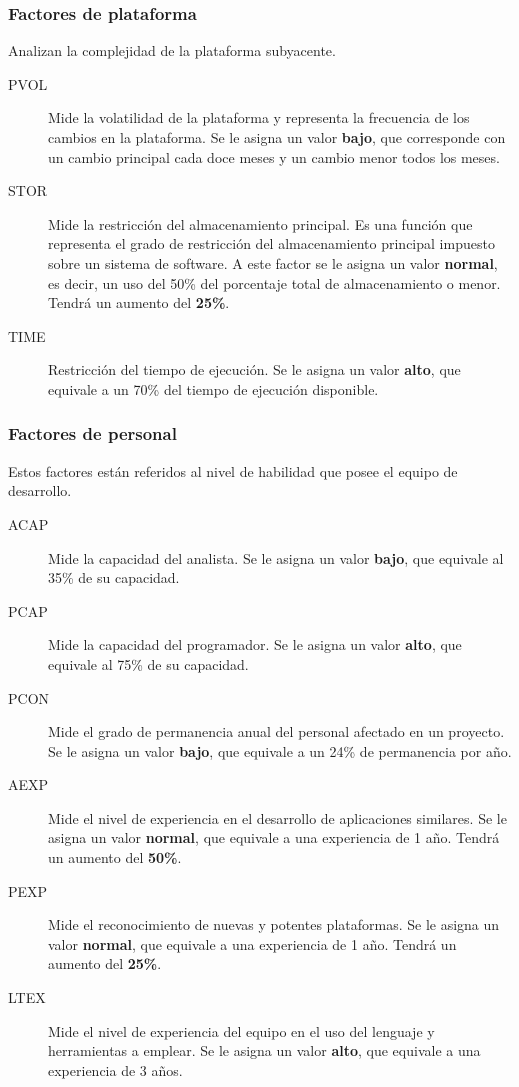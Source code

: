 \documentclass[11pt,a4paper,spanish,twoside]{report}
\begin{document}
\subsubsection{Factores de plataforma}
Analizan la complejidad de la plataforma subyacente.
\begin{description}
\item[PVOL] Mide la volatilidad de la plataforma y representa la frecuencia de
  los cambios en la plataforma. Se le asigna un valor \textbf{bajo}, que
  corresponde con un cambio principal cada doce meses y un cambio menor todos
  los meses.

\item[STOR] Mide la restricción del almacenamiento principal. Es una función
  que representa el grado de restricción del almacenamiento principal
  impuesto sobre un sistema de software. A este factor se le asigna un valor
  \textbf{normal}, es decir, un uso del 50\% del porcentaje total de
  almacenamiento o menor. Tendrá un aumento del \textbf{25\%}.

\item[TIME] Restricción del tiempo de ejecución. Se le asigna un valor
  \textbf{alto}, que equivale a un 70\% del tiempo de ejecución disponible.
\end{description}

\subsubsection{Factores de personal}
Estos factores están referidos al nivel de habilidad que posee el equipo de
desarrollo.
\begin{description}
\item[ACAP] Mide la capacidad del analista. Se le asigna un valor
\textbf{bajo}, que equivale al 35\% de su capacidad.
\item[PCAP] Mide la capacidad del programador. Se le asigna un valor
\textbf{alto}, que equivale al 75\% de su capacidad.
\item[PCON] Mide el grado de permanencia anual del personal afectado en un
proyecto. Se le asigna un valor \textbf{bajo}, que equivale a un 24\% de
permanencia por año.
\item[AEXP] Mide el nivel de experiencia en el desarrollo de aplicaciones
similares. Se le asigna un valor \textbf{normal}, que equivale a una
experiencia de 1 año. Tendrá un aumento del \textbf{50\%}.
\item[PEXP] Mide el reconocimiento de nuevas y potentes plataformas. Se le
asigna un valor \textbf{normal}, que equivale a una experiencia de 1
año. Tendrá un aumento del \textbf{25\%}. 
\item[LTEX] Mide el nivel de experiencia del equipo en el uso del lenguaje y
herramientas a emplear. Se le asigna un valor \textbf{alto}, que equivale a una
experiencia de 3 años.
\end{description}
\end{document}
